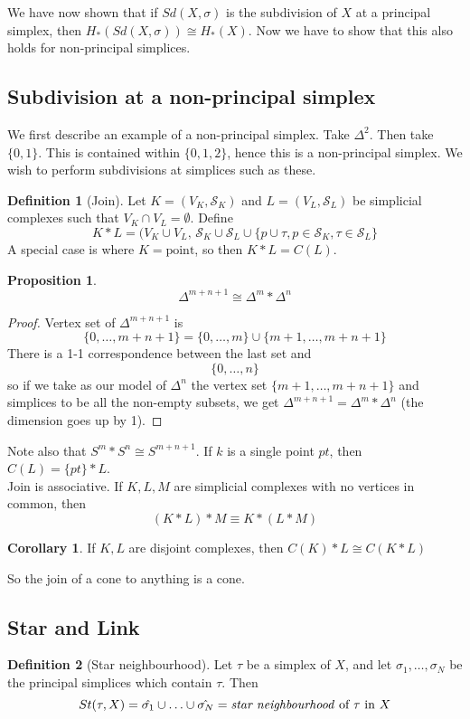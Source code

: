 \documentclass[a4paper,14pt]{extarticle}
\theoremstyle{definition}
\newtheorem*{definition}{Definition}
\newtheorem*{corollary}{Corollary}
\newtheorem*{proposition}{Proposition}
\begin{document}
We have now shown that if $Sd(X,\sigma)$ is the subdivision of $X$ at a principal simplex,
then $H_*(Sd(X,\sigma))\cong H_*(X)$. Now we have to show that this also holds for
non-principal simplices.

\subsection{Subdivision at a non-principal simplex}
We first describe an example of a non-principal simplex. Take $\Delta^2$. Then take $\{0,1\}$.
This is contained within $\{0,1,2\}$, hence this is a non-principal simplex. We wish to 
perform subdivisions at simplices such as these.
\begin{definition}[Join]
	Let $K=(V_K,\mathcal{S}_K)$ and $L=(V_L,\mathcal{S}_L)$ be simplicial complexes such that
	$V_K\cap V_L=\emptyset$. Define 
	\[K*L=(V_K\cup V_L, \,\mathcal{S}_K\cup\mathcal{S}_L\cup\{p\cup\tau, p\in\mathcal{S}_K,\tau\in\mathcal{S}_L\}\]
	A special case is where $K=\text{point}$, so then $K*L=C(L)$.
\end{definition}

\begin{proposition}
	\[\Delta^{m+n+1}\cong\Delta^m*\Delta^n\]
\end{proposition}

\begin{proof}
	Vertex set of $\Delta^{m+n+1}$ is \[\{0,\ldots,m+n+1\}=\{0,\ldots,m\}\cup\{m+1,\ldots,m+n+1\}\] There is a 1-1 correspondence between the last set and \[\{0,\ldots,n\}\] so if we take 
	as our model of $\Delta^n$ the vertex set $\{m+1,\ldots,m+n+1\}$ and simplices to be all the
	non-empty subsets, we get $\Delta^{m+n+1}=\Delta^m*\Delta^n$ (the dimension goes up by 1).
\end{proof}

Note also that $S^m*S^n\cong S^{m+n+1}$. If $k$ is a single point $pt$, then
$C(L)=\{pt\}*L$. \\

Join is associative. If $K,L,M$ are simplicial complexes with no vertices in common, then
\[(K*L)*M\equiv K*(L*M)\]

\begin{corollary}
	If $K,L$ are disjoint complexes, then $C(K)*L\cong C(K*L)$
\end{corollary}
\noindent So the join of a cone to anything is a cone.

\subsection{Star and Link}
\begin{definition}[Star neighbourhood]
	Let $\tau$ be a simplex of $X$, and let $\sigma_1,\ldots,\sigma_N$ be the principal
	simplices which contain $\tau$. Then 
	\[St(\tau,X)=\hat{\sigma_1}\cup\ldots\cup\hat{\sigma_N}=\text{\emph{star neighbourhood} of $\tau$ 
	in $X$}\]
\end{definition}
\end{document}
